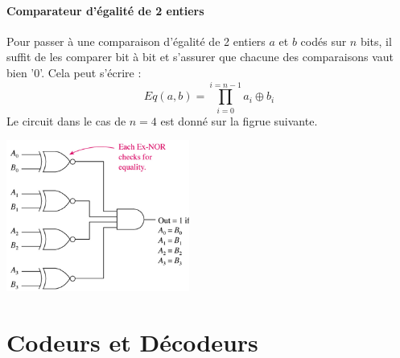 \paragraph{Comparateur d'égalité de 2 entiers}
Pour passer à une comparaison d'égalité de 2 entiers $a$ et $b$ codés sur $n$ bits, il suffit
de les comparer bit à bit et s'assurer que chacune des comparaisons vaut bien '0'. Cela peut s'écrire :
$$Eq(a,b)=\prod_{i=0}^{i=n-1} a_i \oplus b_i$$
Le circuit dans le cas de $n=4$ est donné sur la figrue suivante.
\begin{center}
  \centering
  \includegraphics[width=6cm]{./figures/comparator-2.png}
\end{center}

\section{Codeurs et Décodeurs}

